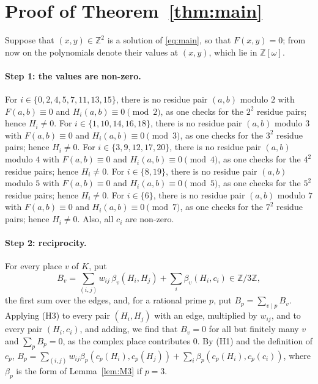 \documentclass[11pt]{article}
\newcommand{\Z}{\mathbb{Z}}
\begin{document}
\section{Proof of Theorem~\ref{thm:main}}

Suppose that $(x,y)\in\Z^2$ is a solution of \eqref{eq:main}, so that $F(x,y)=0$; from now on the polynomials denote their values at $(x,y)$, which lie in $\Z[\omega]$.
\paragraph{Step 1: the values are non-zero.} For $i\in\{0,\allowbreak 2,\allowbreak 4,\allowbreak 5,\allowbreak 7,\allowbreak 11,\allowbreak 13,\allowbreak 15\}$, there is no residue pair $(a,b)$ modulo $2$ with $F(a,b)\equiv0$ and $H_i(a,b)\equiv0\pmod{2}$, as one checks for the $2^2$ residue pairs; hence $H_i\neq0$. For $i\in\{1,\allowbreak 10,\allowbreak 14,\allowbreak 16,\allowbreak 18\}$, there is no residue pair $(a,b)$ modulo $3$ with $F(a,b)\equiv0$ and $H_i(a,b)\equiv0\pmod{3}$, as one checks for the $3^2$ residue pairs; hence $H_i\neq0$. For $i\in\{3,\allowbreak 9,\allowbreak 12,\allowbreak 17,\allowbreak 20\}$, there is no residue pair $(a,b)$ modulo $4$ with $F(a,b)\equiv0$ and $H_i(a,b)\equiv0\pmod{4}$, as one checks for the $4^2$ residue pairs; hence $H_i\neq0$. For $i\in\{8,\allowbreak 19\}$, there is no residue pair $(a,b)$ modulo $5$ with $F(a,b)\equiv0$ and $H_i(a,b)\equiv0\pmod{5}$, as one checks for the $5^2$ residue pairs; hence $H_i\neq0$. For $i\in\{6\}$, there is no residue pair $(a,b)$ modulo $7$ with $F(a,b)\equiv0$ and $H_i(a,b)\equiv0\pmod{7}$, as one checks for the $7^2$ residue pairs; hence $H_i\neq0$. Also, all $c_i$ are non-zero.

\paragraph{Step 2: reciprocity.} For every place $v$ of $K$, put
\begin{equation}\label{eq:B}
B_v=\sum_{(i,j)}w_{ij}\,\beta_v(H_i,H_j)+\sum_i\beta_v(H_i,c_i)\in\Z/3\Z,
\end{equation}
the first sum over the edges, and, for a rational prime $p$, put $B_p=\sum_{v\mid p}B_v$. Applying (H3) to every pair $(H_i,H_j)$ with an edge, multiplied by $w_{ij}$, and to every pair $(H_i,c_i)$, and adding, we find that $B_v=0$ for all but finitely many $v$ and $\sum_pB_p=0$, as the complex place contributes $0$. By (H1) and the definition of $c_p$, $B_p=\sum_{(i,j)}w_{ij}\beta_p(c_p(H_i),c_p(H_j))+\sum_i\beta_p(c_p(H_i),c_p(c_i))$, where $\beta_p$ is the form of Lemma~\ref{lem:M3} if $p=3$.
\end{document}
